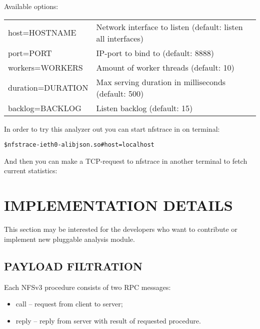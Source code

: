 \documentclass[oneside]{article}
\newcommand{\includetext}[1]{
\begin{alltt}
    % \texttt{\fbox{\parbox{\textwidth}{\small{}}}}
    \small{}
\end{alltt}
}
\newcommand*{\textfile}[1]{\textsf{#1}}
\newcommand*{\textprog}[1]{\textfile{#1}}
\begin{document}
Available options:

\begin{minipage}[t]{\linewidth}
\begin{tabular}{ll}
\textprog{host=HOSTNAME} &
Network interface to listen (default: listen all interfaces)\\
\textprog{port=PORT} &
IP-port to bind to (default: 8888)\\
\textprog{workers=WORKERS} &
Amount of worker threads (default: 10)\\
\textprog{duration=DURATION} &
Max serving duration in milliseconds (default: 500)\\
\textprog{backlog=BACKLOG} &
Listen backlog (default: 15)\\
\end{tabular}
\end{minipage}

In order to try this analyzer out you can start \textprog{nfstrace} in on terminal:
\begin{alltt}
\$ nfstrace -i eth0 -a libjson.so\#host=localhost
\end{alltt}
And then you can make a TCP-request to \textprog{nfstrace} in another terminal to fetch
current statistics:

\begin{minipage}[t]{\linewidth}
\includetext{nfstrace_manual_includes/telnet_output.txt} 
\end{minipage}

\section{IMPLEMENTATION DETAILS}

This section may be interested for the developers who want to contribute or
implement new pluggable analysis module.

\subsection{PAYLOAD FILTRATION}

Each NFSv3 procedure consists of two RPC messages:

\begin{itemize}
    \item call – request from client to server;
    \item reply – reply from server with result of requested procedure.
\end{itemize}
\vspace{5mm}
\end{document}
